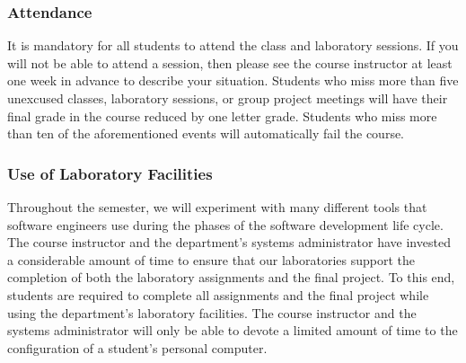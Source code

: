 \subsubsection*{Attendance}

It is mandatory for all students to attend the class and laboratory sessions. If you will not be able to attend a
session, then please see the course instructor at least one week in advance to describe your situation.  Students who
miss more than five unexcused classes, laboratory sessions, or group project meetings will have their final grade in the
course reduced by one letter grade. Students who miss more than ten of the aforementioned events will automatically fail
the course.

% 
% 

\subsubsection*{Use of Laboratory Facilities}

Throughout the semester, we will experiment with many different tools that software engineers use during the phases of
the software development life cycle.  The course instructor and the department's systems administrator have invested a
considerable amount of time to ensure that our laboratories support the completion of both the laboratory assignments and the
final project.  To this end, students are required to complete all assignments and the final project while using the
department's laboratory facilities. The course instructor and the systems administrator will only be able to devote a
limited amount of time to the configuration of a student's personal computer.

